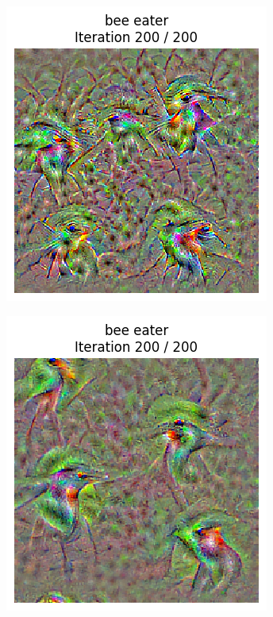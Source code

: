 \begin{figure}[H]
    \centering
    \begin{subfigure}[t]{.33\textwidth}
        \centering
        \includegraphics[width=\linewidth]{figs_propre2/SqueezeNet/SqueezeNet_bird_animated_last_frame.png}
        \caption{}
        \label{fig:class_viz_blur:sub1}
    \end{subfigure}%
    \begin{subfigure}[t]{.33\textwidth}
        \centering
        \includegraphics[width=\linewidth]{figs_propre2/SqueezeNet/SqueezeNet_bird_animated_blur++_last_frame.png}

\end{subfigure}
\end{figure}
